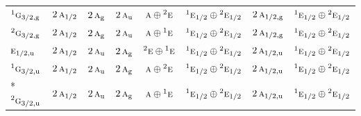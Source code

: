 \documentclass[10pt,a4paper]{article}
\numberwithin{equation}{section}
\newcommand{\irr}[1]{\text{\normalfont\scshape #1}}
\newcommand{\conjpair}[1]{{}^{#1}}
\newcommand{\ptag}[1]{\mathrm{#1}}
\begin{document}
{\begin{longtable}{@{}lccccccc@{}}
$\conjpair{1}\irr{g}_{3/2,\ptag{g}}$ & $2\,\irr{a}_{1/2}$ & $2\,\irr{a}_{\ptag{g}}$ & $2\,\irr{a}_{\ptag{u}}$ & $\irr{a}\oplus \conjpair{2}\irr{e}$ & $\conjpair{1}\irr{e}_{1/2}\oplus \conjpair{2}\irr{e}_{1/2}$ & $2\,\irr{a}_{1/2,\ptag{g}}$ & $\conjpair{1}\irr{e}_{1/2}\oplus \conjpair{2}\irr{e}_{1/2}$\\
$\conjpair{2}\irr{g}_{3/2,\ptag{g}}$ & $2\,\irr{a}_{1/2}$ & $2\,\irr{a}_{\ptag{g}}$ & $2\,\irr{a}_{\ptag{u}}$ & $\irr{a}\oplus \conjpair{1}\irr{e}$ & $\conjpair{1}\irr{e}_{1/2}\oplus \conjpair{2}\irr{e}_{1/2}$ & $2\,\irr{a}_{1/2,\ptag{g}}$ & $\conjpair{1}\irr{e}_{1/2}\oplus \conjpair{2}\irr{e}_{1/2}$\\
$\irr{e}_{1/2,\ptag{u}}$ & $2\,\irr{a}_{1/2}$ & $2\,\irr{a}_{\ptag{u}}$ & $2\,\irr{a}_{\ptag{g}}$ & $\conjpair{2}\irr{e}\oplus \conjpair{1}\irr{e}$ & $\conjpair{1}\irr{e}_{1/2}\oplus \conjpair{2}\irr{e}_{1/2}$ & $2\,\irr{a}_{1/2,\ptag{u}}$ & $\conjpair{1}\irr{e}_{1/2}\oplus \conjpair{2}\irr{e}_{1/2}$\\
$\conjpair{1}\irr{g}_{3/2,\ptag{u}}$ & $2\,\irr{a}_{1/2}$ & $2\,\irr{a}_{\ptag{u}}$ & $2\,\irr{a}_{\ptag{g}}$ & $\irr{a}\oplus \conjpair{2}\irr{e}$ & $\conjpair{1}\irr{e}_{1/2}\oplus \conjpair{2}\irr{e}_{1/2}$ & $2\,\irr{a}_{1/2,\ptag{u}}$ & $\conjpair{1}\irr{e}_{1/2}\oplus \conjpair{2}\irr{e}_{1/2}$\\*
$\conjpair{2}\irr{g}_{3/2,\ptag{u}}$ & $2\,\irr{a}_{1/2}$ & $2\,\irr{a}_{\ptag{u}}$ & $2\,\irr{a}_{\ptag{g}}$ & $\irr{a}\oplus \conjpair{1}\irr{e}$ & $\conjpair{1}\irr{e}_{1/2}\oplus \conjpair{2}\irr{e}_{1/2}$ & $2\,\irr{a}_{1/2,\ptag{u}}$ & $\conjpair{1}\irr{e}_{1/2}\oplus \conjpair{2}\irr{e}_{1/2}$\\
\bottomrule\end{longtable}}
\end{document}
